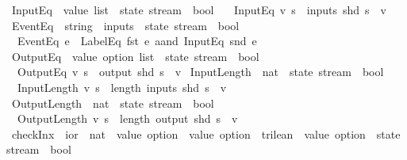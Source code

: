 \begin{isabellebody}
%
\isadelimproof
\isanewline
%
\endisadelimproof
\isanewline
{}\isamarkupfalse%
\ InputEq\ {\isacharcolon}{\isacharcolon}\ {\isachardoublequoteopen}value\ list\ {\isasymRightarrow}\ state\ stream\ {\isasymRightarrow}\ bool{\isachardoublequoteclose}\ \isanewline
\ \ {\isachardoublequoteopen}InputEq\ v\ s\ {\isasymequiv}\ inputs\ {\isacharparenleft}shd\ s{\isacharparenright}\ {\isacharequal}\ v{\isachardoublequoteclose}\isanewline
\isanewline
{}\isamarkupfalse%
\ EventEq\ {\isacharcolon}{\isacharcolon}\ {\isachardoublequoteopen}{\isacharparenleft}string\ {\isasymtimes}\ inputs{\isacharparenright}\ {\isasymRightarrow}\ state\ stream\ {\isasymRightarrow}\ bool{\isachardoublequoteclose}\ \isanewline
\ \ {\isachardoublequoteopen}EventEq\ e\ {\isacharequal}\ LabelEq\ {\isacharparenleft}fst\ e{\isacharparenright}\ aand\ InputEq\ {\isacharparenleft}snd\ e{\isacharparenright}{\isachardoublequoteclose}\isanewline
\isanewline
{}\isamarkupfalse%
\ OutputEq\ {\isacharcolon}{\isacharcolon}\ {\isachardoublequoteopen}value\ option\ list\ {\isasymRightarrow}\ state\ stream\ {\isasymRightarrow}\ bool{\isachardoublequoteclose}\ \isanewline
\ \ {\isachardoublequoteopen}OutputEq\ v\ s\ {\isasymequiv}\ output\ {\isacharparenleft}shd\ s{\isacharparenright}\ {\isacharequal}\ v{\isachardoublequoteclose}\isanewline
\isanewline
{}\isamarkupfalse%
\ InputLength\ {\isacharcolon}{\isacharcolon}\ {\isachardoublequoteopen}nat\ {\isasymRightarrow}\ state\ stream\ {\isasymRightarrow}\ bool{\isachardoublequoteclose}\ \isanewline
\ \ {\isachardoublequoteopen}InputLength\ v\ s\ {\isasymequiv}\ length\ {\isacharparenleft}inputs\ {\isacharparenleft}shd\ s{\isacharparenright}{\isacharparenright}\ {\isacharequal}\ v{\isachardoublequoteclose}\isanewline
\isanewline
{}\isamarkupfalse%
\ OutputLength\ {\isacharcolon}{\isacharcolon}\ {\isachardoublequoteopen}nat\ {\isasymRightarrow}\ state\ stream\ {\isasymRightarrow}\ bool{\isachardoublequoteclose}\ \isanewline
\ \ {\isachardoublequoteopen}OutputLength\ v\ s\ {\isasymequiv}\ length\ {\isacharparenleft}output\ {\isacharparenleft}shd\ s{\isacharparenright}{\isacharparenright}\ {\isacharequal}\ v{\isachardoublequoteclose}\isanewline
\isanewline
{}\isamarkupfalse%
\ {\isachardoublequoteopen}checkInx{\isachardoublequoteclose}\ {\isacharcolon}{\isacharcolon}\ {\isachardoublequoteopen}ior\ {\isasymRightarrow}\ nat\ {\isasymRightarrow}\ {\isacharparenleft}value\ option\ {\isasymRightarrow}\ value\ option\ {\isasymRightarrow}\ trilean{\isacharparenright}\ {\isasymRightarrow}\ value\ option\ {\isasymRightarrow}\ state\ stream\ {\isasymRightarrow}\ bool{\isachardoublequoteclose}\ \isanewline

\end{isabellebody}
